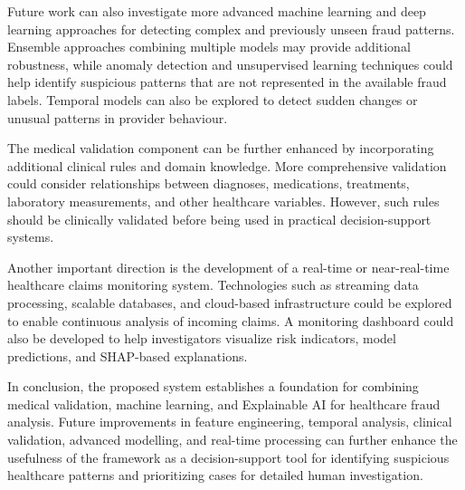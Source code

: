 Future work can also investigate more advanced machine learning and deep learning approaches for detecting complex and previously unseen fraud patterns. Ensemble approaches combining multiple models may provide additional robustness, while anomaly detection and unsupervised learning techniques could help identify suspicious patterns that are not represented in the available fraud labels. Temporal models can also be explored to detect sudden changes or unusual patterns in provider behaviour.

The medical validation component can be further enhanced by incorporating additional clinical rules and domain knowledge. More comprehensive validation could consider relationships between diagnoses, medications, treatments, laboratory measurements, and other healthcare variables. However, such rules should be clinically validated before being used in practical decision-support systems.

Another important direction is the development of a real-time or near-real-time healthcare claims monitoring system. Technologies such as streaming data processing, scalable databases, and cloud-based infrastructure could be explored to enable continuous analysis of incoming claims. A monitoring dashboard could also be developed to help investigators visualize risk indicators, model predictions, and SHAP-based explanations.

In conclusion, the proposed system establishes a foundation for combining medical validation, machine learning, and Explainable AI for healthcare fraud analysis. Future improvements in feature engineering, temporal analysis, clinical validation, advanced modelling, and real-time processing can further enhance the usefulness of the framework as a decision-support tool for identifying suspicious healthcare patterns and prioritizing cases for detailed human investigation.
